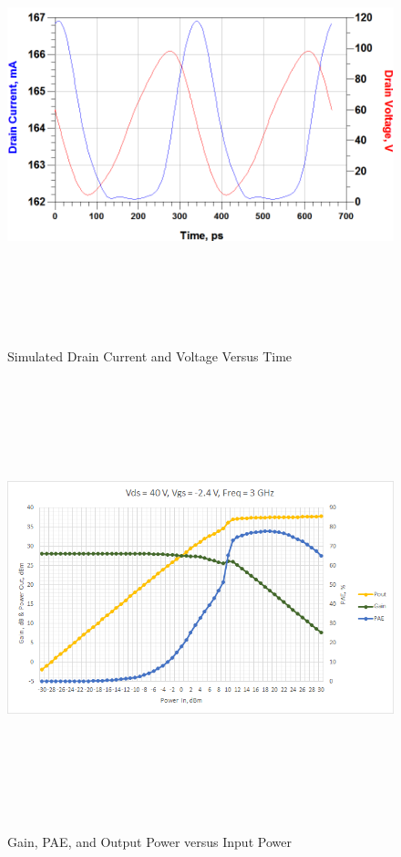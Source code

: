 \begin{figure}
  \centering
  \includegraphics[width=5in,height=5in,keepaspectratio]{figures/amp_sim/ids_vds_wave}\\
  \caption{Simulated Drain Current and Voltage Versus Time}
  \label{fig:ids_vds_wave}

  \vspace*{\floatsep}

  \includegraphics[width=5in,height=5in,keepaspectratio]{figures/amp_sim/singletonesweep}\\
  \caption{Gain, PAE, and Output Power versus Input Power}
  \label{fig:singletonesweep}

\end{figure}



